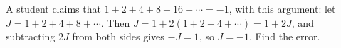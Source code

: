 A student claims that $1+2+4+8+16+\cdots=-1$, with this argument: let $J=1+2+4+8+\cdots$. Then $J=1+2(1+2+4+\cdots)=1+2J$, and subtracting $2J$ from both sides gives $-J=1$, so $J=-1$. Find the error.
